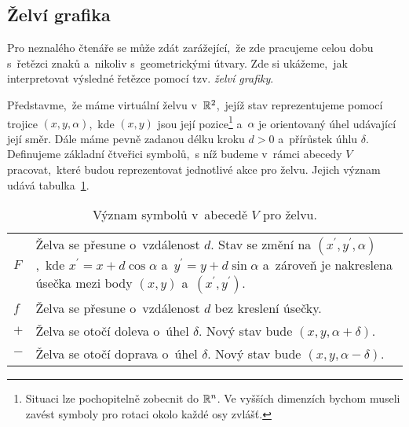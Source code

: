 \subsection{Želví grafika}\label{subsec:zelvi-grafika}

Pro neznalého čtenáře se může zdát zarážející,~že zde pracujeme celou dobu s~řetězci znaků a~nikoliv s~geometrickými útvary. Zde si ukážeme,~jak interpretovat výsledné řetězce pomocí tzv. \emph{želví grafiky}.

Představme,~že máme virtuální želvu v~$\mathbb{R}^2$,~jejíž stav reprezentujeme pomocí trojice $(x,y,\alpha)$,~kde $(x,y)$ jsou její pozice\footnote{Situaci lze pochopitelně zobecnit do $\mathbb{R}^n$. Ve vyšších dimenzích bychom museli zavést symboly pro rotaci okolo každé osy zvlášť.} a~$\alpha$ je orientovaný úhel udávající její směr. Dále máme pevně zadanou délku kroku $d>0$ a~přírůstek úhlu $\delta$. Definujeme základní čtveřici symbolů,~s níž budeme v~rámci abecedy $V$ pracovat,~které budou reprezentovat jednotlivé akce pro želvu. Jejich význam udává tabulka~\ref{table:vyznam-symbolu-zelva}.
\begin{table}[h]
    \centering
    \begin{tabular}{lp{}}
        $F$ & Želva se přesune o~vzdálenost $d$. Stav se změní na $(x^\prime,y^\prime,\alpha)$,~kde $x^\prime=x+d\cos\alpha$ a~$y^\prime=y+d\sin\alpha$ a~zároveň je nakreslena úsečka mezi body $(x,y)$ a~$(x^\prime,y^\prime)$.\\
        $f$ & Želva se přesune o~vzdálenost $d$ bez kreslení úsečky.\\
        $+$ & Želva se otočí doleva o~úhel $\delta$. Nový stav bude $(x,y,\alpha+\delta)$.\\
        $-$ & Želva se otočí doprava o~úhel $\delta$. Nový stav bude $(x,y,\alpha-\delta)$.
    \end{tabular}
    \caption{Význam symbolů v~abecedě $V$ pro želvu.}
    \label{table:vyznam-symbolu-zelva}
\end{table}

